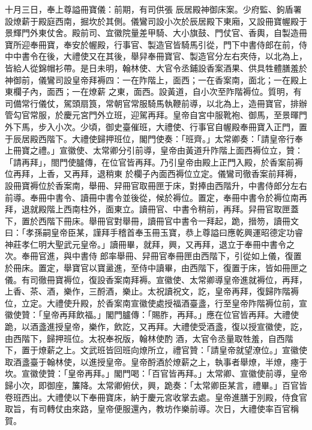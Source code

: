\begin{pinyinscope}
 十月三日，奉上尊謚冊寶儀：前期，有司供張
 辰居殿神御床案。少府監、鉤盾署設燎薪于殿庭西南，掘坎於其側。儀鸞司設小次於辰居殿下東廂，又設冊寶幄殿于景輝門外東仗舍。殿前司、宜徽院量差甲騎、大小旗鼓、門仗官、香輿，自製造冊寶所迎奉冊寶，奉安於幄殿，行事官、製造官皆騎馬引從，門下中書侍郎在前，侍中中書令在後，大禮使又在其後，舉舁奉冊寶官、製造官分左右夾侍，以北為上，皆給人從錦帽衫帶。是日未明，翰林使、大官令丞鋪設香案酒果、供具牲體膳羞於神御前，儀鸞司設皇帝拜褥四：一在阼階上，面西；一在香案南，面北；一在殿上東欄子內，面西；一在燎薪
 之東，面西。設黃道，自小次至阼階褥位。質明，有司備常行儀仗，駕頭扇筤，常朝官常服騎馬執鞭前導，以北為上，造冊寶官，排辦管勾官常服，於慶元宮門外立班，迎駕再拜。皇帝自宮中服靴袍、御馬，至景暉門外下馬，步入小次。少頃，御史臺催班，大禮使、行事官自幄殿奉冊寶入正門，置于辰居殿西階下。大禮使歸押班位，閣門使奏：「班齊。」太常卿奏：「請皇帝行奉上冊寶之禮。」宣徽使、太常卿分引前導，皇帝由黃道升阼階上面西褥位立，贊：「請再拜」，閤門使臚傳，在位官皆再拜。乃引皇帝由殿上正門入殿，於香案前褥位再拜，上香，又再拜，退稍東
 於欄子內面西褥位立定。儀鸞司徹香案前拜褥，設冊寶褥位於香案南，舉冊、舁冊官取冊匣于床，對捧由西階升，中書侍郎分左右前導。奉冊中書令、讀冊中書令並後從，候於褥位。置定，奉冊中書令於褥位南再拜，退就殿階上西南柱外，面東立。讀冊官、中書令稍前，再拜。舁冊官取匣蓋下，置於西階下冊床。舉冊官對舉冊，讀冊官中書令一拜起，跪，搢笏，讀冊文曰：「孝孫嗣皇帝臣某，謹拜手稽首奉玉冊玉寶，恭上尊謚曰應乾興運昭德定功睿神莊孝仁明大聖武元皇帝。」讀冊畢，就拜，興，又再拜，退立于奉冊中書令之次。奉冊官進，與中書侍
 郎率舉冊、舁冊官奉冊匣由西階下，引從如上儀，復置於冊床。置定，舉寶官以寶盝進，至侍中讀畢，由西階下，復置于床，皆如冊匣之儀。有司徹冊寶褥位，復設香案南拜褥。宣徽使、太常卿導皇帝進就褥位，再拜，上香、茶、酒，樂作，三酹酒，樂止。太祝讀祝文，訖，皇帝再拜，復歸阼階褥位，立定。大禮使升殿，於香案南宣徽使處授福酒臺盞，行至皇帝阼階褥位前，宣徽使贊：「皇帝再拜飲福。」閣門臚傳：「賜胙，再拜。」應在位官皆再拜。大禮使跪，以酒盞進授皇帝，樂作，飲訖，又再拜。大禮使受酒盞，復以授宣徽使，訖，由西階下，歸押班位。太祝奉祝版，翰林使酌
 酒，太官令丞量取牲羞，自西階下，置于燎薪之上。文武班皆回班向燎所立，禮官贊：「請皇帝就望潦位。」宣徽使取酒盞臺于翰林使，以進授皇帝。皇帝酹酒於燎薪之上，執事者舉燎，半燎，瘞于坎。宣徽使贊：「皇帝再拜。」閣門喝：「百官皆再拜。」太常卿、宣徽使前導，皇帝歸小次，即御座，簾降。太常卿俯伏，興，跪奏：「太常卿臣某言，禮畢。」百官皆卷班西出。大禮使以下奉冊寶床，納于慶元宮收掌去處。皇帝進膳于別殿，侍食官取旨，有司轉仗由來路，皇帝便服還內，教坊作樂前導。次日，大禮使率百官稱賀。




\end{pinyinscope}
